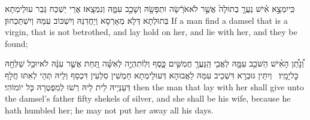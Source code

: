 {כִּֽי\maqqaf יִמְצָ֣א אִ֗ישׁ נַעֲרָ֤ בְתוּלָה֙ אֲשֶׁ֣ר לֹא\maqqaf אֹרָ֔שָׂה וּתְפָשָׂ֖הּ וְשָׁכַ֣ב עִמָּ֑הּ וְנִמְצָֽאוּ׃}
{אֲרֵי יַשְׁכַּח גְּבַר עוּלֵימְתָא בְּתוּלְתָא דְּלָא מְאָרְסָא וְיַחֲדִנַּהּ וְיִשְׁכּוֹב עִמַּהּ וְיִשְׁתַּכְחוּן׃}
{If a man find a damsel that is a virgin, that is not betrothed, and lay hold on her, and lie with her, and they be found;}{}

{וְ֠נָתַ֠ן הָאִ֨ישׁ הַשֹּׁכֵ֥ב עִמָּ֛הּ לַאֲבִ֥י הַֽנַּעֲרָ֖ חֲמִשִּׁ֣ים כָּ֑סֶף וְלֽוֹ\maqqaf תִהְיֶ֣ה לְאִשָּׁ֗ה תַּ֚חַת אֲשֶׁ֣ר עִנָּ֔הּ לֹא\maqqaf יוּכַ֥ל שַׁלְּחָ֖הּ כׇּל\maqqaf יָמָֽיו׃ \setuma }
{וְיִתֵּין גּוּבְרָא דִּשְׁכֵיב עִמַּהּ לַאֲבוּהָא דְּעוּלֵימְתָא חַמְשִׁין סִלְעִין דִּכְסַף וְלֵיהּ תְּהֵי לְאִתּוּ חֲלָף דְּעַנְּיַיהּ לֵית לֵיהּ רְשׁוּ לְמִפְטְרַהּ כָּל יוֹמוֹהִי׃}
{then the man that lay with her shall give unto the damsel’s father fifty shekels of silver, and she shall be his wife, because he hath humbled her; he may not put her away all his days.}{}

